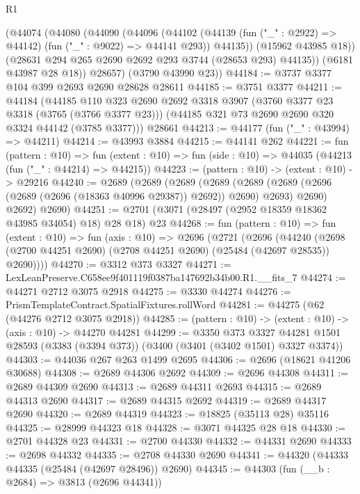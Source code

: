 \begin{lexlean}{R1}
\begin{coremodule}
        (@44074
          (@44080
            (@44090
              (@44096
                (@44102
                  (@44139 (fun ("_" : @2922) => @44142) (fun ("_" : @9022) => @44141 @293))
                  @44135))
              (@15962 @43985 @18))
            (@28631 @294 @265 @2690 @2692 @293 @3744 (@28653 @293) @44135))
          (@6181 @43987 @28 @18))
        @28657)
      (@3790 @43990 @23))
@44184 := @3737 @3377 @104 @399 @2693 @2690 @28628 @28611
@44185 := @3751 @3377
@44211 := @44184
    (@44185
      @110
      @323
      @2690
      @2692
      @3318
      @3907
      (@3760 @3377 @23 @3318 (@3765 (@3766 @3377 @23)))
      (@44185 @321 @73 @2690 @2690 @320 @3324 @44142 (@3785 @3377)))
    @28661
@44213 := @44177 (fun ("_" : @43994) => @44211)
@44214 := @43993 @3884
@44215 := @44141 @262
@44221 := fun (pattern : @10) =>
  fun (extent : @10) => fun (side : @10) => @44035 (@44213 (fun ("_" : @44214) => @44215))
@44223 := (pattern : @10) -> (extent : @10) -> @29216
@44240 := @2689
    (@2689
      (@2689
        (@2689
          (@2689 (@2689 (@2696 (@2689 (@2696 (@18363 @40996 @29387)) @2692)) @2690) @2693)
          @2690)
        @2692)
      @2690)
@44251 := @2701 (@3071 (@28497 (@2952 @18359 @18362 @43985 @34054) @18) @28 @18) @23
@44268 := fun (pattern : @10) =>
  fun (extent : @10) =>
  fun (axis : @10) =>
  @2696
    (@2721
      (@2696
        (@44240 (@2698 (@2700 @44251 @2690) (@2708 @44251 @2690) (@25484 (@42697 @28535)) @2690))))
@44270 := @3312 @373 @3327
@44271 := LexLeanPreserve.C658ee9f401119f0387ba147692b34b00.R1.__fits_7
@44274 := @44271 @2712 @3075 @2918
@44275 := @3330 @44274
@44276 := PrismTemplateContract.SpatialFixtures.rollWord
@44281 := @44275 (@62 (@44276 @2712 @3075 @2918))
@44285 := (pattern : @10) -> (extent : @10) -> (axis : @10) -> @44270 @44281
@44299 := @3350
    @373
    @3327
    @44281
    @1501
    @28593
    (@3383 (@3394 @373))
    (@3400 (@3401 (@3402 @1501) @3327 @3374))
@44303 := @44036 @267 @263 @1499 @2695
@44306 := @2696 (@18621 @41206 @30688)
@44308 := @2689 @44306 @2692
@44309 := @2696 @44308
@44311 := @2689 @44309 @2690
@44313 := @2689 @44311 @2693
@44315 := @2689 @44313 @2690
@44317 := @2689 @44315 @2692
@44319 := @2689 @44317 @2690
@44320 := @2689 @44319
@44323 := @18825 (@35113 @28) @35116
@44325 := @28999 @44323 @18
@44328 := @3071 @44325 @28 @18
@44330 := @2701 @44328 @23
@44331 := @2700 @44330
@44332 := @44331 @2690
@44333 := @2698 @44332
@44335 := @2708 @44330 @2690
@44341 := @44320 (@44333 @44335 (@25484 (@42697 @28496)) @2690)
@44345 := @44303 (fun (__b : @2684) => @3813 (@2696 @44341))

\end{coremodule}
\end{lexlean}
